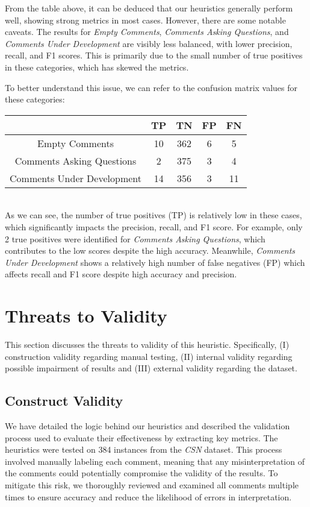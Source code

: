 \noindent From the table above, it can be deduced that our heuristics generally perform well, showing strong metrics in most cases. However, there are some notable caveats. The results for \textit{Empty Comments}, \textit{Comments Asking Questions}, and \textit{Comments Under Development} are visibly less balanced, with lower precision, recall, and F1 scores. This is primarily due to the small number of true positives in these categories, which has skewed the metrics.

\noindent To better understand this issue, we can refer to the confusion matrix values for these categories:
\begin{center}
	\begin{tabular}{|c|c|c|c|c|}
		\hline
		& \textbf{TP} & \textbf{TN} & \textbf{FP} & \textbf{FN} \\
		\hline Empty Comments             & 10     & 362      & 6   & 5    \\
		\hline Comments Asking Questions  & 2     & 375      & 3   & 4    \\
		\hline Comments Under Development & 14     & 356      & 3   & 11    \\
		\hline
	\end{tabular}
\end{center}

\noindent \\ As we can see, the number of true positives (TP) is relatively low in these cases, which significantly impacts the precision, recall, and F1 score. For example, only 2 true positives were identified for \textit{Comments Asking Questions}, which contributes to the low scores despite the high accuracy. Meanwhile, \textit{Comments Under Development} shows a relatively high number of false negatives (FP) which affects recall and F1 score despite high accuracy and precision.

\section{Threats to Validity}
This section discusses the threats to validity of this heuristic. Specifically, (I) construction validity regarding manual testing, (II) internal validity regarding possible impairment of results and (III) external validity regarding the dataset.

\subsection{Construct Validity}
We have detailed the logic behind our heuristics and described the validation process used to evaluate their effectiveness by extracting key metrics. The heuristics were tested on 384 instances from the \textit{CSN} dataset. This process involved manually labeling each comment, meaning that any misinterpretation of the comments could potentially compromise the validity of the results. To mitigate this risk, we thoroughly reviewed and examined all comments multiple times to ensure accuracy and reduce the likelihood of errors in interpretation.

